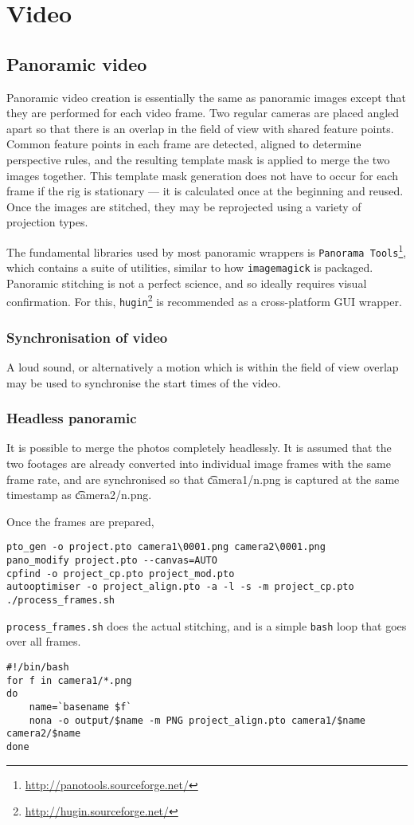 \section{Video}
\subsection{Panoramic video}
Panoramic video creation is essentially the same as panoramic images except that they are performed for each video frame. Two regular cameras are placed angled apart so that there is an overlap in the field of view with shared feature points. Common feature points in each frame are detected, aligned to determine perspective rules, and the resulting template mask is applied to merge the two images together. This template mask generation does not have to occur for each frame if the rig is stationary --- it is calculated once at the beginning and reused. Once the images are stitched, they may be reprojected using a variety of projection types.

The fundamental libraries used by most panoramic wrappers is {\tt Panorama Tools}\footnote{\url{http://panotools.sourceforge.net/}}, which contains a suite of utilities, similar to how {\tt imagemagick} is packaged. Panoramic stitching is not a perfect science, and so ideally requires visual confirmation. For this, {\tt hugin}\footnote{\url{http://hugin.sourceforge.net/}} is recommended as a cross-platform GUI wrapper.

\subsubsection{Synchronisation of video}

A loud sound, or alternatively a motion which is within the field of view overlap may be used to synchronise the start times of the video.

\subsubsection{Headless panoramic}

It is possible to merge the photos completely headlessly. It is assumed that the two footages are already converted into individual image frames with the same frame rate, and are synchronised so that {\t camera1/n.png} is captured at the same timestamp as {\t camera2/n.png}.

Once the frames are prepared, %

\begin{lstlisting}
pto_gen -o project.pto camera1\0001.png camera2\0001.png
pano_modify project.pto --canvas=AUTO
cpfind -o project_cp.pto project_mod.pto
autooptimiser -o project_align.pto -a -l -s -m project_cp.pto
./process_frames.sh
\end{lstlisting}

{\tt process\_frames.sh} does the actual stitching, and is a simple {\tt bash} loop that goes over all frames.

\begin{lstlisting}
#!/bin/bash
for f in camera1/*.png
do
    name=`basename $f`
    nona -o output/$name -m PNG project_align.pto camera1/$name camera2/$name
done
\end{lstlisting}

